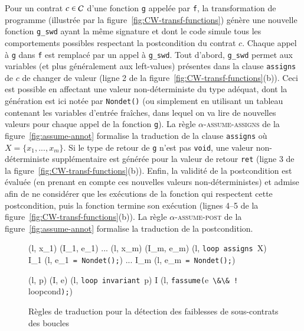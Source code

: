 Pour un contrat $c\in{\ensuremath\mathcal{C}}$ d'une fonction \lstinline'g' appelée par \lstinline'f',
la transformation de programme (illustrée par la
figure~\ref{fig:CW-transf-functions}) génère une nouvelle fonction
\lstinline{g_swd} ayant la même signature et dont le code simule tous les
comportements possibles respectant la postcondition du contrat $c$.
Chaque appel à \lstinline'g' dans \lstinline'f' est remplacé par un appel à
\lstinline{g_swd}.
Tout d'abord, \lstinline{g_swd} permet aux variables (et plus généralement aux
left-values) présentes dans la clause \lstinline'assigns' de $c$ de changer de
valeur (ligne 2 de la figure~\ref{fig:CW-transf-functions}(b)).
Ceci est possible en affectant une valeur non-déterministe du type adéquat,
dont la génération est ici notée par \lstinline{Nondet()} (ou simplement en
utilisant un tableau contenant les variables d'entrée fraîches, dans lequel on
va lire de nouvelles valeurs pour chaque appel de la fonction \lstinline'g').
La règle \textsc{$\alpha$-assume-assigns} de la figure~\ref{fig:assume-annot}
formalise la traduction de la clause \lstinline'assigns' où
$X = \{x_1, ..., x_m\}$.
Si le type de retour de \lstinline'g' n'est pas \lstinline{void}, une valeur
non-déterministe supplémentaire est générée pour la valeur de retour
\lstinline{ret} (ligne 3 de la figure~\ref{fig:CW-transf-functions}(b)).
Enfin, la validité de la postcondition est évaluée (en prenant en compte ces
nouvelles valeurs non-déterministes) et admise afin de ne considérer que les
exécutions de la fonction qui respectent cette postcondition, puis la fonction
termine son exécution (lignes 4--5 de la
figure~\ref{fig:CW-transf-functions}(b)).
La règle \textsc{$\alpha$-assume-post} de la figure~\ref{fig:assume-annot}
formalise la traduction de la postcondition.

\begin{figure}[tb]
  \scriptsize{
    {
      {
        (l, x_1) \trule (I_1, e_1) \quad
        ... \quad
        (l, x_m) \trule (I_m, e_m) \quad
      }
      {
        (l, \mbox{\lstinline'loop assigns'}~X\semicolon) \arule
        I_1 \concat (l, e_1~\mbox{\lstinline'= Nondet();'})
        \concat ...
        \concat I_m \concat (l, e_m~\mbox{\lstinline'= Nondet();'})
      }{}
    }

    {
      {(l, p) \prule (I, e)}
      {
        (l, \mbox{\lstinline'loop invariant'}~p\semicolon) \arule
        I \concat (l, \mbox{\lstinline'fassume('}e~\mbox{\lstinline'\&\& !'}
        loopcond\mbox{\lstinline');'})
      }{}
    }

  }
  \caption{Règles de traduction pour la détection des faiblesses de
    sous-contrats des boucles}
  \label{fig:assume-loop-annot}
\end{figure}

